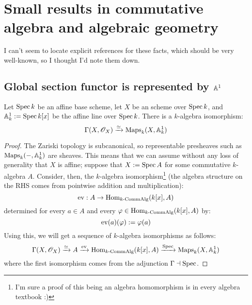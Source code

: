     \section{Small results in commutative algebra and algebraic geometry}
        I can't seem to locate explicit references for these facts, which should be very well-known, so I thought I'd note them down.

        \subsection{Global section functor is represented by \texorpdfstring{$\mathbb{A}^1$}{}}
            \begin{lemma}
                Let $\operatorname{Spec} k$ be an affine base scheme, let $X$ be an scheme over $\operatorname{Spec} k$, and $\mathbb{A}^1_k := \operatorname{Spec} k[x]$ be the affine line over $\operatorname{Spec} k$. There is a $k$-algebra isomorphism:
                    $$\Gamma(X, \mathscr{O}_X) \xrightarrow[]{\simeq} \mathrm{Maps}_k(X, \mathbb{A}^1_k)$$
            \end{lemma}
                \begin{proof}
                    The Zariski topology is subcanonical, so representable presheaves such as $\mathrm{Maps}_k(-, \mathbb{A}^1_k)$ are sheaves. This means that we can assume without any loss of generality that $X$ is affine; suppose that $X := \operatorname{Spec} A$ for some commutative $k$-algebra $A$. Consider, then, the $k$-algebra isomorphism\footnote{I'm sure a proof of this being an algebra homomorphism is in every algebra textbook :)} (the algebra structure on the RHS comes from pointwise addition and multiplication):
                        $$\mathrm{ev}: A \to \mathrm{Hom}_{k\text{-}\mathrm{Comm}\mathrm{Alg}}(k[x], A)$$
                    determined for every $a \in A$ and every $\varphi \in \mathrm{Hom}_{k\text{-}\mathrm{Comm}\mathrm{Alg}}(k[x], A)$ by:
                        $$\mathrm{ev}(a)( \varphi ) := \varphi(a)$$
                    Using this, we will get a sequence of $k$-algebra isomorphisms as follows:
                        $$\Gamma(X, \mathscr{O}_X) \xrightarrow[]{\simeq} A \xrightarrow[]{\mathrm{ev}} \mathrm{Hom}_{k\text{-}\mathrm{Comm}\mathrm{Alg}}(k[x], A) \xrightarrow[]{\operatorname{Spec}} \mathrm{Maps}_k(X, \mathbb{A}^1_k)$$
                    where the first isomorphism comes from the adjunction $\Gamma \dashv \operatorname{Spec}$.
                \end{proof}

